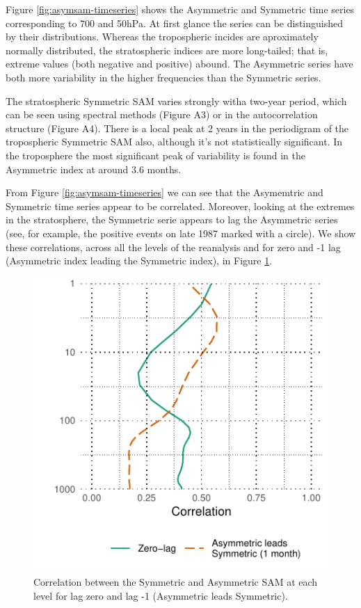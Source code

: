 \documentclass[]{ametsocV5}
\begin{document}
Figure \ref{fig:asymsam-timeseries} shows the Asymmetric and Symmetric
time series corresponding to 700 and 50hPa. At first glance the series
can be distinguished by their distributions. Whereas the tropospheric
incides are aproximately normally distributed, the stratospheric indices
are more long-tailed; that is, extreme values (both negative and
positive) abound. The Asymmetric series have both more variability in
the higher frequencies than the Symmetric series.

The stratospheric Symmetric SAM varies strongly witha two-year period,
which can be seen using spectral methods (Figure A3) or in the
autocorrelation structure (Figure A4). There is a local peak at 2 years
in the periodigram of the tropospheric Symmetric SAM also, although it's
not statistically significant. In the troposphere the most significant
peak of variability is found in the Asymmetric index at around 3.6
months.

From Figure \ref{fig:asymsam-timeseries} we can see that the Asymemtric
and Symmetric time series appear to be correlated. Moreover, looking at
the extremes in the stratosphere, the Symmetric serie appears to lag the
Asymmetric series (see, for example, the positive events on late 1987
marked with a circle). We show these correlations, across all the levels
of the reanalysis and for zero and -1 lag (Asymmetric index leading the
Symmetric index), in Figure \ref{fig:cor-lev}.

\begin{figure}
\includegraphics{cor-lev-1} \caption[Correlation between the Symmetric and Asymmetric SAM at each level for lag zero and lag -1 (Asymmetric leads Symmetric)]{Correlation between the Symmetric and Asymmetric SAM at each level for lag zero and lag -1 (Asymmetric leads Symmetric).}\label{fig:cor-lev}
\end{figure}
\end{document}
